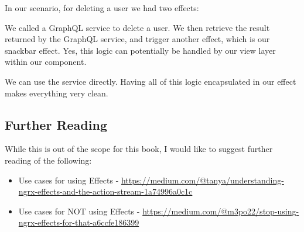 In our scenario, for deleting a user we had two effects:

We called a GraphQL service to delete a user. We then retrieve the result returned by the GraphQL service, and trigger another effect, which is our snackbar effect. Yes, this logic can potentially be handled by our view layer within our component. 

We can use the service directly. Having all of this logic encapsulated in our effect makes everything very clean.

\subsection{ Further Reading }
While this is out of the scope for this book, I would like to suggest further reading of the following:
\begin{itemize}
  \item Use cases for using Effects - \href{"Understanding NgRxEffects and the Action Stream"}{https://medium.com/@tanya/understanding-ngrx-effects-and-the-action-stream-1a74996a0c1c}
  \item Use cases for NOT using Effects - \href{Stop using ngrx/effects for that}{https://medium.com/@m3po22/stop-using-ngrx-effects-for-that-a6ccfe186399}
\end{itemize}
